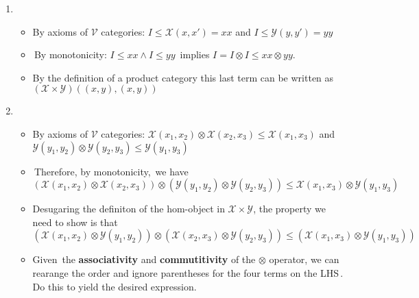 \begin{enumerate}
    \item \begin{itemize}
            \item By axioms of $\mathcal{V}$ categories: $I \leq \mathcal{X}(x,x')=xx$ and $I \leq \mathcal{Y}(y,y')=yy$
            \item \,By monotonicity: $I \leq xx \land I \leq yy$\, implies $I = I \otimes I \leq xx \otimes yy$.
            \item By the definition of a product category this last term can be written as $(\mathcal{X} \times \mathcal{Y})((x,y),(x,y))$
          \end{itemize}
    \item \begin{itemize}
            \item By axioms of $\mathcal{V}$ categories: $\mathcal{X}(x_1,x_2) \otimes \mathcal{X}(x_2,x_3) \leq \mathcal{X}(x_1,x_3)$ and $\mathcal{Y}(y_1,y_2) \otimes \mathcal{Y}(y_2,y_3) \leq \mathcal{Y}(y_1,y_3)$
            \item \,Therefore, by monotonicity,\, we have $(\mathcal{X}(x_1,x_2) \otimes \mathcal{X}(x_2,x_3)) \otimes (\mathcal{Y}(y_1,y_2) \otimes \mathcal{Y}(y_2,y_3)) \leq \mathcal{X}(x_1,x_3) \otimes  \mathcal{Y}(y_1,y_3)$
            \item Desugaring the definiton of the hom-object in $\mathcal{X}\times\mathcal{Y}$, the property we need to show is that $(\mathcal{X}(x_1,x_2) \otimes\mathcal{Y}(y_1,y_2)) \otimes (\mathcal{X}(x_2,x_3) \otimes\mathcal{Y}(y_2,y_3)) \leq (\mathcal{X}(x_1,x_3) \otimes\mathcal{Y}(y_1,y_3))$
            \item Given \,the \textbf{associativity} and \textbf{commutitivity} of the $\otimes$ operator, we can rearange the order and ignore parentheses for the four terms on the LHS\,. Do this to yield the desired expression.
          \end{itemize}
  \end{enumerate}
